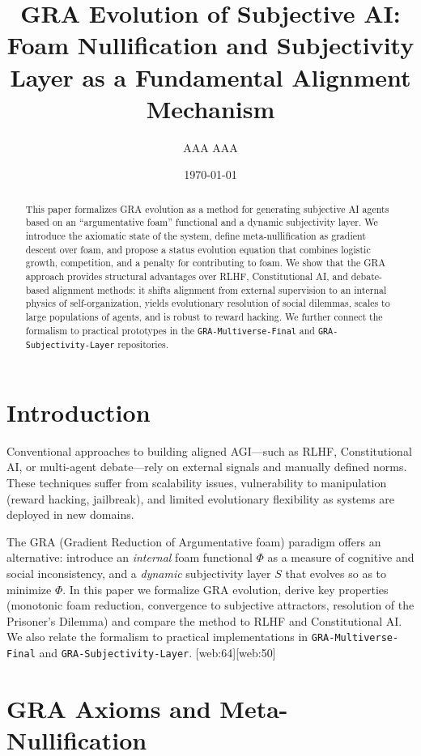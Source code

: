 \documentclass[11pt,a4paper]{article}
\title{GRA Evolution of Subjective AI:\\
Foam Nullification and Subjectivity Layer as a Fundamental Alignment Mechanism}
\author{AAA AAA}
\date{\today}
\begin{document}
\maketitle

\begin{abstract}
This paper formalizes GRA evolution as a method for generating subjective AI agents based on an ``argumentative foam'' functional and a dynamic subjectivity layer.
We introduce the axiomatic state of the system, define meta-nullification as gradient descent over foam, and propose a status evolution equation that combines logistic growth, competition, and a penalty for contributing to foam.
We show that the GRA approach provides structural advantages over RLHF, Constitutional AI, and debate-based alignment methods: it shifts alignment from external supervision to an internal physics of self-organization, yields evolutionary resolution of social dilemmas, scales to large populations of agents, and is robust to reward hacking.
We further connect the formalism to practical prototypes in the \texttt{GRA-Multiverse-Final} and \texttt{GRA-Subjectivity-Layer} repositories.
\end{abstract}

\section{Introduction}

Conventional approaches to building aligned AGI---such as RLHF, Constitutional AI, or multi-agent debate---rely on external signals and manually defined norms.
These techniques suffer from scalability issues, vulnerability to manipulation (reward hacking, jailbreak), and limited evolutionary flexibility as systems are deployed in new domains.

The GRA (Gradient Reduction of Argumentative foam) paradigm offers an alternative: introduce an \emph{internal} foam functional $\Phi$ as a measure of cognitive and social inconsistency, and a \emph{dynamic} subjectivity layer $S$ that evolves so as to minimize $\Phi$.
In this paper we formalize GRA evolution, derive key properties (monotonic foam reduction, convergence to subjective attractors, resolution of the Prisoner's Dilemma) and compare the method to RLHF and Constitutional AI.
We also relate the formalism to practical implementations in \texttt{GRA-Multiverse-Final} and \texttt{GRA-Subjectivity-Layer}. [web:64][web:50]

\section{GRA Axioms and Meta-Nullification}
\end{document}
